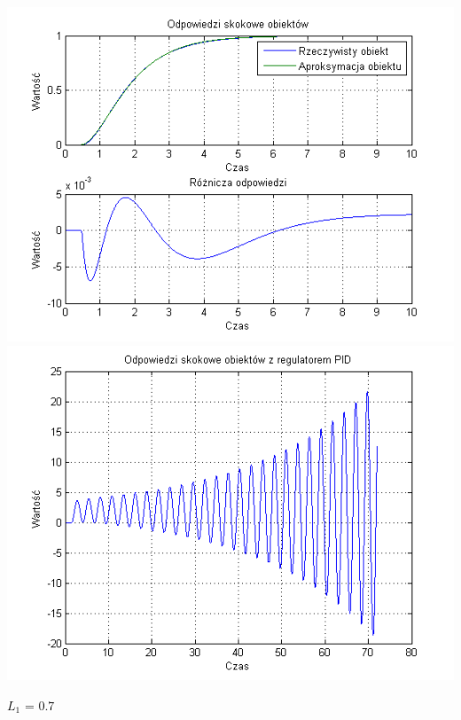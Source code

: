 \documentclass[10pt,a4paper]{article}
\begin{document}
\begin{center}
\includegraphics[scale=1]{images/dwa/skrypt_163.png}\\
\includegraphics[scale=1]{images/dwa/skrypt_164.png}\\
\end{center}
\newpage
$L_1$ = 0.7
\end{document}
